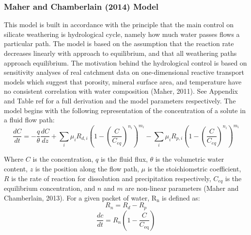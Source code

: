 \FloatBarrier









\newpage




\subsubsection*{Maher and Chamberlain (2014) Model}

This model is built in accordance with the principle that the main control on silicate weathering is hydrological cycle, namely how much water passes flows a particular path. The model is based on the assumption that the reaction rate decreases linearly with approach to equilibrium, and that all weathering paths approach equilibrium. The motivation behind the hydrological control is based on sensitivity analyses of real catchment data on one-dimensional reactive transport models which suggest that porosity, mineral surface area, and temperature have no consistent correlation with water composition (Maher, 2011). See Appendix and Table ref for a full derivation and the model parameters respectively. The model begins with the following representation of the concentration of a solute in a fluid flow path:\\ 

\begin{equation}
    \frac{dC}{dt} = -\frac{q}{\theta} \frac{dC}{dz} + \sum_i \mu_i R_{d,i} \left( 1 - \left( \frac{C}{C_{eq}} \right)^{n_i} \right)^{m_i} - \sum_i \mu_i R_{p,i} \left( 1 - \left( \frac{C}{C_{eq}} \right)^{n_i} \right)^{m_i}
\end{equation}

Where \( C \) is the concentration, \( q \) is the fluid flux, \( \theta \) is the volumetric water content, \( z \) is the position along the flow path, \( \mu \) is the stoichiometric coefficient, \( R \) is the rate of reaction for dissolution and precipitation respectively, \( C_{eq} \) is the equilibrium concentration, and \( n \) and \( m \) are non-linear parameters (Maher and Chamberlain, 2013). For a given packet of water, R$_{\text{n}}$ is defined as: \\

\begin{equation}
R_n = R_{d} - R_{p}
\end{equation} 
\begin{equation}
\frac{dc}{dt} = R_n \left( 1 - \frac{C}{C_{\text{eq}}} \right)
\end{equation} \\

